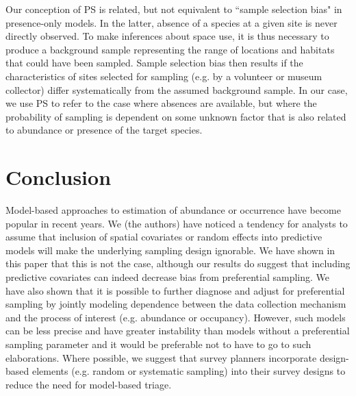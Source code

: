 \documentclass[times,mee,doublespace,]{besauth2}
\begin{document}
Our conception of PS is related, but not equivalent to ``sample selection bias" \citep[e.g.][]{PhillipsEtAl2009} in presence-only models.  In the latter, absence of a species at a given site is never directly observed.  To make inferences about space use, it is thus necessary to produce a background sample representing the range of locations and habitats that could have been sampled. Sample selection bias then results if the characteristics of sites selected for sampling (e.g. by a volunteer or museum collector) differ systematically from the assumed background sample.  In our case, we use PS to refer to the case where absences are available, but where the probability of sampling is dependent on some unknown factor that is also related to abundance or presence of the target species.
 
\section{Conclusion}

Model-based approaches to estimation of abundance or occurrence have become popular in recent years.  We (the authors) have noticed a tendency for analysts to assume that inclusion of spatial covariates or random effects into predictive models will make the underlying sampling design ignorable. We have shown in this paper that this is not the case, although our results do suggest that including predictive covariates can indeed decrease bias from preferential sampling.  We have also shown that it is possible to further diagnose and adjust for preferential sampling by jointly modeling dependence between the data collection mechanism and the process of interest (e.g. abundance or occupancy).  However, such models can be less precise and have greater instability than models without a preferential sampling parameter and it would be preferable not to have to go to such elaborations. Where possible, we suggest that survey planners incorporate design-based elements (e.g. random or systematic sampling) into their survey designs to reduce the need for model-based triage.




\vspace{.3in}
\end{document}
